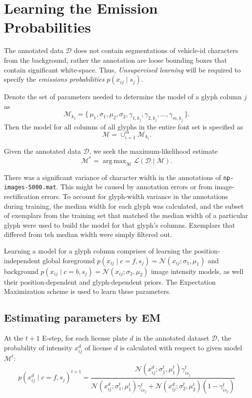 \documentclass[a4paper,12pt]{article}
\newcommand{\lhood}{\ensuremath{\mathcal{L}}}
\newcommand{\truth}{\ensuremath{\mathcal{D}}}
\newcommand{\model}{\ensuremath{\mathcal{M}}}
\newcommand{\optmodel}{\ensuremath{\mathcal{M}^*}}
\DeclareMathOperator*{\argmax}{arg\,max}
\begin{document}
\section{Learning the Emission Probabilities}
The annotated data $\truth$ does not contain segmentations of
vehicle-id characters from the background, rather the annotation are
loose bounding boxes that contain significant white-space. Thus,
\emph{Unsupervised learning} will be required to specify the
\emph{emissions probabilities} $p(x_{ij} \mid s_j)$.

Denote the set of parameters needed to determine the model of a glyph
column $j$ as
\[\model_{k_j}=\{\,\mu_1,\sigma_1,\mu_2,\sigma_2,\gamma_{1,k_j},\gamma_{2,k_j},\ldots,\gamma_{m,k_j}\,\}.\]
Then the model for all columns of all glyphs in the entire font set is
specified as
\[
\model = \cup_{i=1}^m\model_{k_i}.
\]

Given the annotated data $\truth$, we seek the maximum-likelihood
estimate \[ \optmodel = \argmax_{\model} \lhood(\truth \mid \model).\]

There was a significant variance of character width in the annotations
of \texttt{np-images-5000.mat}. This might be caused by annotation
errors or from image-rectification errors. To account for glyph-width
variance in the annotations during training, the median width for each
glyph was calculated, and the subset of exemplars from the training
set that matched the median width of a particular glyph were used to
build the model for that glyph's columns. Exemplars that differed from
teh median width were simply filtered out.

Learning a model for a glyph column comprises of learning the
position-independent global foreground $ p(x_{ij}\mid
c=f,s_j)=\mathcal{N}(x_{ij};\sigma_1,\mu_1)$ and background $p(x_{ij}
\mid c=b,s_j)=\mathcal{N}(x_{ij};\sigma_2,\mu_2)$ image intensity
models, as well their position-dependent and glyph-dependent
priors. The Expectation Maximization scheme is used to learn these
parameters.

\subsection{Estimating parameters by EM}
At the $t+1$ E-step, for each license plate $d$ in the annotated
dataset \truth, the probability of intensity $x^d_{ij}$ of license $d$
is calculated with respect to given model $\model^t$:
\[
  p(x^d_{ij} \mid c=f, s_j)^{t+1} =
  \frac{\mathcal{N}(x^d_{ij};\sigma_1^t,\mu_1^t)\gamma_{is_j}^t}{\mathcal{N}(x^d_{ij};\sigma_1^t,\mu_1^t)\gamma_{is_j}^t+\mathcal{N}(x^d_{ij};\sigma_2^t,\mu_2^t)(1-\gamma_{is_j}^t)}
\]
\end{document}
